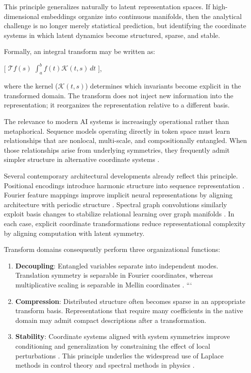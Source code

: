 This principle generalizes naturally to latent representation spaces. If high-dimensional embeddings organize into continuous manifolds, then the analytical challenge is no longer merely statistical prediction, but identifying the coordinate systems in which latent dynamics become structured, sparse, and stable.

Formally, an integral transform may be written as:

[
$\mathcal{T}{f}(s)$  $\int_{a}^{b} f(t)\mathcal{K}(t,s) \,dt$
],

where the kernel ($\mathcal{K}(t,s)$) determines which invariants become explicit in the transformed domain. The transform does not inject new information into the representation; it reorganizes the representation relative to a different basis.

The relevance to modern AI systems is increasingly operational rather than metaphorical. Sequence models operating directly in token space must learn relationships that are nonlocal, multi-scale, and compositionally entangled. When those relationships arise from underlying symmetries, they frequently admit simpler structure in alternative coordinate systems \cite{bronstein2021geometric}.

Several contemporary architectural developments already reflect this principle. Positional encodings introduce harmonic structure into sequence representation \cite{Vaswani2017}. Fourier feature mappings improve implicit neural representations by aligning architecture with periodic structure \cite{tancik2020fourier}. Spectral graph convolutions similarly exploit basis changes to stabilize relational learning over graph manifolds \cite{defferrard2016convolutional}. In each case, explicit coordinate transformations reduce representational complexity by aligning computation with latent symmetry.

Transform domains consequently perform three organizational functions:

\begin{enumerate}
\item \textbf{Decoupling}: Entangled variables separate into independent modes. Translation symmetry is separable in Fourier coordinates, whereas multiplicative scaling is separable in Mellin coordinates \cite{debnath2012integral}.
```
\item \textbf{Compression}: Distributed structure often becomes sparse in an appropriate transform basis. Representations that require many coefficients in the native domain may admit compact descriptions after a transformation.

\item \textbf{Stability}: Coordinate systems aligned with system symmetries improve conditioning and generalization by constraining the effect of local perturbations \cite{mallat2012group}. This principle underlies the widespread use of Laplace methods in control theory and spectral methods in physics \cite{oppenheim1996signals}.

\end{enumerate}

